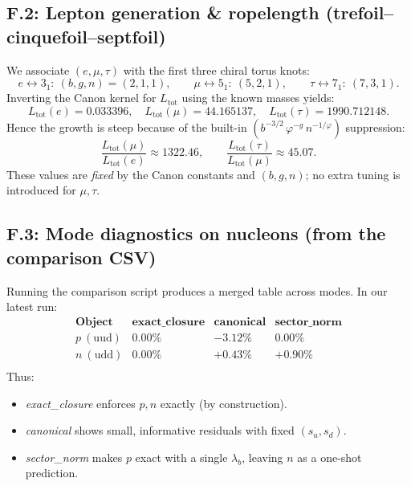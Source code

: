 \documentclass[11pt, preprint,titlepage]{revtex4-2}
\begin{document}
		\subsection*{F.2: Lepton generation \& ropelength (trefoil–cinquefoil–septfoil)}
		We associate \((e,\mu,\tau)\) with the first three chiral torus knots:
		\[
		e \leftrightarrow 3_1:\ (b,g,n)=(2,1,1),\qquad
		\mu \leftrightarrow 5_1:\ (5,2,1),\qquad
		\tau \leftrightarrow 7_1:\ (7,3,1).
		\]
		Inverting the Canon kernel for \(L_{\text{tot}}\) using the known masses yields:\footnotesize
		\[
		L_{\text{tot}}(e)=0.033396,\quad
		L_{\text{tot}}(\mu)=44.165137,\quad
		L_{\text{tot}}(\tau)=1990.712148.
		\]
		\normalsize
		Hence the growth is steep because of the built-in \((b^{-3/2}\,\varphi^{-g}\,n^{-1/\varphi})\) suppression:
		\[
		\frac{L_{\text{tot}}(\mu)}{L_{\text{tot}}(e)}\approx 1322.46,\qquad
		\frac{L_{\text{tot}}(\tau)}{L_{\text{tot}}(\mu)}\approx 45.07.
		\]
		These values are \emph{fixed} by the Canon constants and \((b,g,n)\); no extra tuning is introduced for \(\mu,\tau\).

		\subsection*{F.3: Mode diagnostics on nucleons (from the comparison CSV)}
		Running the comparison script produces a merged table across modes. In our latest run:
		\[
		\begin{array}{llll}
		\textbf{Object} & \textbf{exact\_closure} & \textbf{canonical} & \textbf{sector\_norm} \\
		\hline
		p\ (\text{uud}) & 0.00\% & {-}3.12\% & 0.00\% \\
		n\ (\text{udd}) & 0.00\% & {+}0.43\% & {+}0.90\% \\
		\end{array}
		\]
		Thus:
		\begin{itemize}
		\item \textit{exact\_closure} enforces \(p,n\) exactly (by construction).
		\item \textit{canonical} shows small, informative residuals with fixed \((s_u,s_d)\).
		\item \textit{sector\_norm} makes \(p\) exact with a single \(\lambda_b\), leaving \(n\) as a one-shot prediction.
		\end{itemize}
\end{document}

